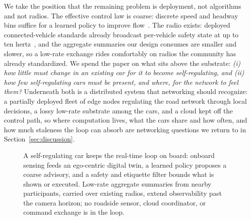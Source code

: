 We take the position that the remaining problem is deployment, not algorithms and not radios. The effective control law is coarse: discrete speed and headway bins suffice for a learned policy to improve flow~\cite{self_regulating_cars,stern2018dissipation}. The radio exists: deployed connected-vehicle standards already broadcast per-vehicle safety state at up to ten hertz~\cite{sae2020j2735,etsi2019cam,kenney2011dedicated}, and the aggregate summaries our design consumes are smaller and slower, so a low-rate exchange rides comfortably on radios the community has already standardized. We spend the paper on what sits above the substrate: \emph{(i) how little must change in an existing car for it to become self-regulating, and (ii) how few self-regulating cars must be present, and where, for the network to feel them?} Underneath both is a distributed system that networking should recognize: a partially deployed fleet of edge nodes regulating the road network through local decisions, a lossy low-rate substrate among the cars, and a cloud kept off the control path, so where computation lives, what the cars share and how often, and how much staleness the loop can absorb are networking questions we return to in Section~\ref{sec:discussion}.

\begin{figure}[t]
\centering
{}
\caption{A self-regulating car keeps the real-time loop on board: onboard sensing feeds an ego-centric digital twin, a learned policy proposes a coarse advisory, and a safety and etiquette filter bounds what is shown or executed. Low-rate aggregate summaries from nearby participants, carried over existing radios, extend observability past the camera horizon; no roadside sensor, cloud coordinator, or command exchange is in the loop.}
\label{fig:system-vision}
\vspace{-0.3cm}
\end{figure}

